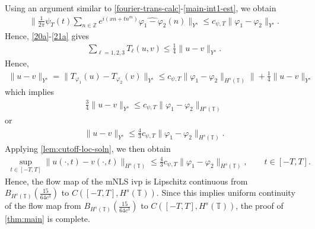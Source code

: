 \documentclass[12pt,reqno]{amsart}
\numberwithin{equation}{section}  %
\numberwithin{figure}{section}
\newcommand{\zz}{\mathbb{Z}}
\newcommand{\ci}{\mathbb{T}}
\newcommand{\wh}{\widehat}
\newcommand{\vp}{\varphi}
\theoremstyle{plain}
\theoremstyle{definition}
\theoremstyle{remark}
\begin{document}
%
%
Using an argument similar to \eqref{fourier-trans-calc}-\eqref{main-int1-est},
we obtain
%
%
\begin{equation*}
	\begin{split}
		\| \frac{1}{2\pi} \psi_{T}(t) \sum_{n \in
		\zz}e^{i\left( xn + tn^{m} \right)} \wh{\vp_1 - \vp_2}(n)\|_{Y^s}
		\le c_{\psi,T} \|\vp_{1} - \vp_{2}\|_{Y^s}.
	\end{split}
\end{equation*}
%
%
Hence, \eqref{20a}-\eqref{21a} gives
%
%
\begin{equation*}
	\begin{split}
		\sum_{\ell=1,2,3} T_{\ell}(u,v) \le \frac{1}{4}\|u-v\|_{Y^s}.
	\end{split}
\end{equation*}
%
%
Hence,
%
%
\begin{equation*}
	\begin{split}
		\|u -v \|_{Y^s} = \|T_{\vp_1}(u) - T_{\vp_2}(v) \|_{Y^s} \le c_{\psi,T}
		\|\vp_{1} - \vp_{2} \|_{H^{s}\left( \ci \right)}\| +
		\frac{1}{4} \|u -v \|_{Y^s}
	\end{split}
\end{equation*}
%
%
which implies
%
%
\begin{equation*}
	\begin{split}
		\frac{3}{4} \|u-v\|_{Y^s} \le c_{\psi,T} \|\vp_1 - \vp_2 \|_{H^s(\ci)}
	\end{split}
\end{equation*}
%
%
or
%
%
\begin{equation*}
	\begin{split}
		\|u -v \|_{Y^s} \le \frac{4}{3} c_{\psi,T} \|\vp_1 - \vp_2 \|_{H^{s}(\ci)}.
	\end{split}
\end{equation*}
%
%
Applying \autoref{lem:cutoff-loc-soln}, we then obtain
%
%
	 \begin{equation*}
		 \begin{split}
       \sup_{t \in \left[ -T, T \right]}\|u(\cdot, t) -v(\cdot, t) \|_{H^s(\ci)} \le \frac{4}{3} c_{\psi,T} \|\vp_1 -
			\vp_2 \|_{H^{s}(\ci)}, \qquad t \in [-T, T].
		 \end{split}
	 \end{equation*}
   Hence, the flow map of the mNLS ivp is Lipschitz continuous from
   $B_{H^{s}(\ci)}( \frac{15}{64c^{3}})$ to  $C(\left[ -T, T \right],
   H^{s}(\ci))$. Since this implies uniform continuity of the flow map from
   $B_{H^{s}(\ci)}( \frac{15}{64c^{3}})$ to  $C(\left[ -T, T \right],
   H^{s}(\ci))$, the proof of \autoref{thm:main} is complete. \qquad
   \qedsymbol
%
%
%
%
\end{document}
